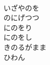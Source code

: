 \documentclass[10pt,b5j]{tarticle} %
\begin{document}
\begin{enumerate}
\begin{minipage}[c]{\blocksize}
    \end{minipage}
    \begin{minipage}[c]{\blocksize}
        
        \vspace{\linespace}
        \item~\\
        いざやのを\\
        のにげつつ\\
        にのをり\\
        にのをし\\
        きのるがまま\\
        ひわん
    
    \end{minipage}
\end{enumerate} %
\end{document}
